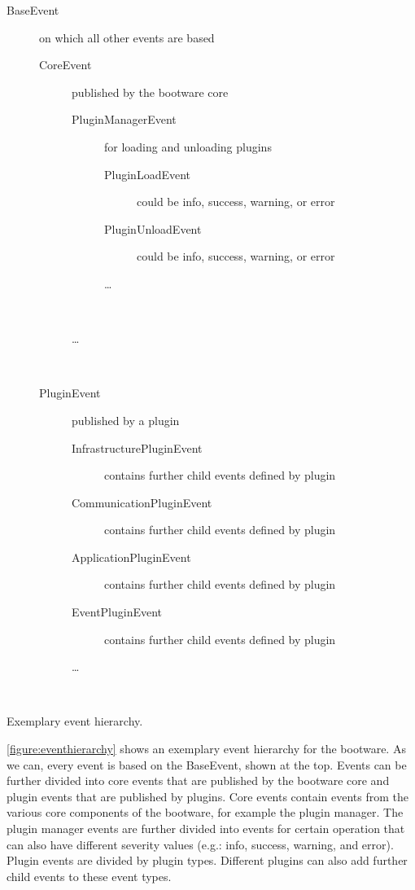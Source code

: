 \vspace*{\baselineskip}
\begingroup
	\centering
	\captionsetup{type=figure}
	\begin{description}
		\item[BaseEvent] on which all other events are based
		\begin{description}
			\item[CoreEvent] published by the bootware core
			\begin{description}
				\item[PluginManagerEvent] for loading and unloading plugins
				\begin{description}
					\item[PluginLoadEvent] could be info, success, warning, or error
					\item[PluginUnloadEvent] could be info, success, warning, or error
					\item[\ldots] ~
				\end{description}
				\item[\ldots] ~
			\end{description}
		\end{description}
		\begin{description}
			\item[PluginEvent] published by a plugin
			\begin{description}
				\item[InfrastructurePluginEvent] contains further child events defined by plugin
				\item[CommunicationPluginEvent] contains further child events defined by plugin
				\item[ApplicationPluginEvent] contains further child events defined by plugin
				\item[EventPluginEvent] contains further child events defined by plugin
				\item[\ldots] ~
			\end{description}
		\end{description}
	\end{description}
	\caption{Exemplary event hierarchy.}
	\label{figure:eventhierarchy}
\endgroup

\autoref{figure:eventhierarchy} shows an exemplary event hierarchy for the bootware.
As we can, every event is based on the BaseEvent, shown at the top.
Events can be further divided into core events that are published by the bootware core and plugin events that are published by plugins.
Core events contain events from the various core components of the bootware, for example the plugin manager.
The plugin manager events are further divided into events for certain operation that can also have different severity values (e.g.: info, success, warning, and error).
Plugin events are divided by plugin types.
Different plugins can also add further child events to these event types.

